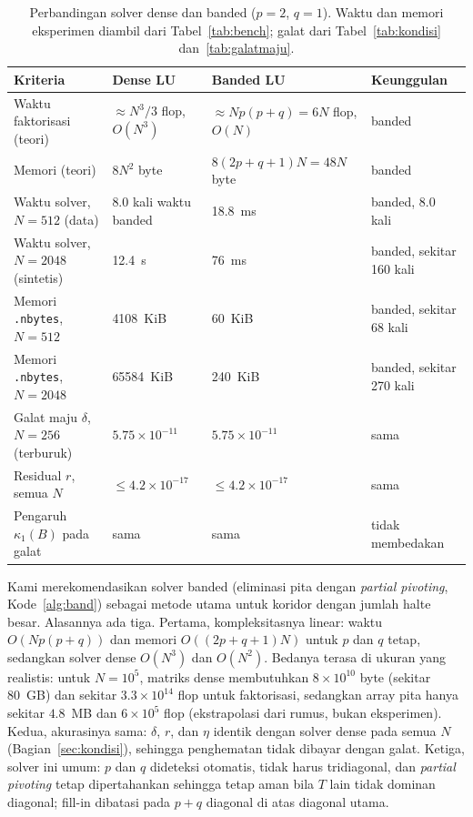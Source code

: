 \documentclass[12pt,a4paper]{article}
\numberwithin{equation}{section}
\begin{document}
\begin{table}[H]
\centering
\caption{Perbandingan solver dense dan banded ($p=2$, $q=1$). Waktu dan memori eksperimen diambil dari
Tabel~\ref{tab:bench}; galat dari Tabel~\ref{tab:kondisi} dan~\ref{tab:galatmaju}.}
\label{tab:rekomendasi}
\small
\begin{tabular}{@{}>{\raggedright}p{}>{\raggedright}p{}>{\raggedright}p{}>{\raggedright\arraybackslash}p{}@{}}
\toprule
Kriteria & Dense LU & Banded LU & Keunggulan\\
\midrule
Waktu faktorisasi (teori) & $\approx N^3/3$ flop, $O(N^3)$ & $\approx Np(p+q)=6N$ flop, $O(N)$ & banded\\
Memori (teori) & $8N^2$ byte & $8(2p+q+1)N=48N$ byte & banded\\
Waktu solver, $N=512$ (data) & 8.0 kali waktu banded & 18.8~ms & banded, 8.0 kali\\
Waktu solver, $N=2048$ (sintetis) & 12.4~s & 76~ms & banded, sekitar 160 kali\\
Memori \texttt{.nbytes}, $N=512$ & 4108~KiB & 60~KiB & banded, sekitar 68 kali\\
Memori \texttt{.nbytes}, $N=2048$ & 65584~KiB & 240~KiB & banded, sekitar 270 kali\\
Galat maju $\delta$, $N=256$ (terburuk) & $5.75\times10^{-11}$ & $5.75\times10^{-11}$ & sama\\
Residual $r$, semua $N$ & $\le4.2\times10^{-17}$ & $\le4.2\times10^{-17}$ & sama\\
Pengaruh $\kappa_1(B)$ pada galat & sama & sama & tidak membedakan\\
\bottomrule
\end{tabular}
\end{table}

Kami merekomendasikan solver banded (eliminasi pita dengan \emph{partial pivoting}, Kode~\ref{alg:band}) sebagai metode
utama untuk koridor dengan jumlah halte besar. Alasannya ada tiga. Pertama, kompleksitasnya linear: waktu $O(Np(p+q))$
dan memori $O((2p+q+1)N)$ untuk $p$ dan $q$ tetap, sedangkan solver dense $O(N^3)$ dan $O(N^2)$. Bedanya terasa di
ukuran yang realistis: untuk $N=10^5$, matriks dense membutuhkan $8\times10^{10}$ byte (sekitar 80~GB) dan sekitar
$3.3\times10^{14}$ flop untuk faktorisasi, sedangkan array pita hanya sekitar $4.8$~MB dan $6\times10^{5}$ flop
(ekstrapolasi dari rumus, bukan eksperimen). Kedua, akurasinya sama: $\delta$, $r$, dan $\eta$ identik dengan solver dense
pada semua $N$ (Bagian~\ref{sec:kondisi}), sehingga penghematan tidak dibayar dengan galat. Ketiga, solver ini umum:
$p$ dan $q$ dideteksi otomatis, tidak harus tridiagonal, dan \emph{partial pivoting} tetap dipertahankan sehingga
tetap aman bila $T$ lain tidak dominan diagonal; fill-in dibatasi pada $p+q$ diagonal di atas diagonal utama.
\end{document}
